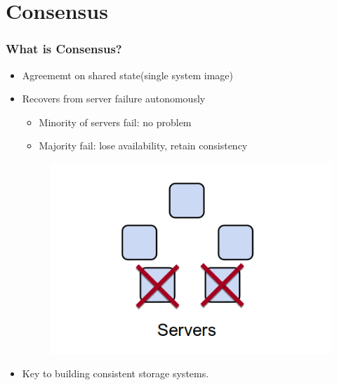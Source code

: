 \section{Consensus}

\begin{frame}
    \frametitle{What is Consensus?}
    \begin{itemize}
        \item Agreememt on shared state(single system image)
        \item Recovers from server failure autonomously
            \begin{itemize}
                \item Minority of servers fail: no problem
                \item Majority fail: lose availability, retain consistency
            \end{itemize}
        \begin{figure}
            \centering
            \includegraphics[scale=0.3]{./figures/concensus.png}
        \end{figure}
        \item Key to building consistent storage systems.
    \end{itemize}
\end{frame}

